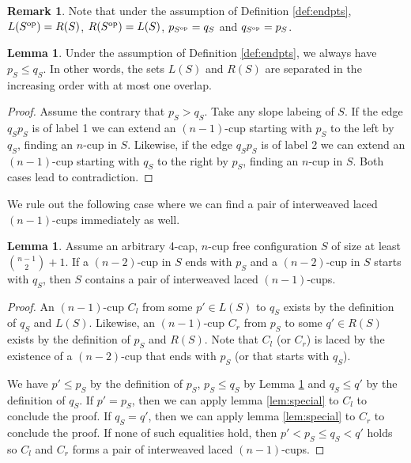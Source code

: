 \documentclass{amsart}
\newcommand{\txt}[1]{\textnormal{#1}}
\newcommand{\op}{\txt{op}}
\theoremstyle{definition}
\newtheorem{lemma}[thm]{Lemma}
\newtheorem{remark}[thm]{Remark}
\numberwithin{thm}{section}
\begin{document}
\begin{remark}
\label{rem:psqs}
Note that under the assumption of Definition \ref{def:endpts},
$L(S^\op) = R(S)$, $R(S^\op) = L(S)$, $p_{S^\op} = q_S$ and $q_{S^\op} = p_S$.
\end{remark}

\begin{lemma}
\label{lem:endpts}
Under the assumption of Definition \ref{def:endpts}, 
we always have $p_S \leq q_S$.
In other words, the sets $L(S)$ and $R(S)$ are separated in the increasing order with at most one overlap.
\end{lemma}
\begin{proof}
Assume the contrary that $p_S > q_S$. 
Take any slope labeing of $S$. If the edge $q_Sp_S$ is of label 1 we can extend an $(n-1)$-cup starting with $p_S$ to the left by $q_S$, finding an $n$-cup in $S$.
Likewise, if the edge $q_Sp_S$ is of label 2 we can extend an $(n-1)$-cup starting with $q_S$ to the right by $p_S$, finding an $n$-cup in $S$.
Both cases lead to contradiction.
\end{proof}

We rule out the following case where we can find a pair of interweaved laced $(n-1)$-cups immediately as well.
\begin{lemma}
\label{lem:david}
Assume an arbitrary 4-cap, $n$-cup free configuration $S$ of size at least $\binom{n-1}{2} + 1$.
If a $(n-2)$-cup in $S$ ends with $p_S$ and a $(n-2)$-cup in $S$ starts with $q_S$,
then $S$ contains a pair of interweaved laced $(n-1)$-cups.
\end{lemma}
\begin{proof}
An $(n-1)$-cup $C_l$ from some $p' \in L(S)$ to $q_S$ exists by the definition of $q_S$ and $L(S)$.
Likewise, an $(n-1)$-cup $C_r$ from $p_S$ to some $q' \in R(S)$ exists by the definition of $p_S$ and $R(S)$.
Note that $C_l$ (or $C_r$) is laced by the existence of a $(n-2)$-cup that ends with $p_S$ (or that starts with $q_S$).

We have $p' \leq p_S$ by the definition of $p_S$, $p_S \leq q_S$ by Lemma \ref{lem:endpts} and  $q_S \leq q'$ by the definition of $q_S$.
If $p' = p_S$, then we can apply lemma \ref{lem:special} to $C_l$ to conclude the proof.
If $q_S = q'$, then we can apply lemma \ref{lem:special} to $C_r$ to conclude the proof.
If none of such equalities hold, then $p' < p_S \leq q_S < q'$ holds so $C_l$ and $C_r$ forms a pair of interweaved laced $(n-1)$-cups.
\end{proof}
\end{document}
